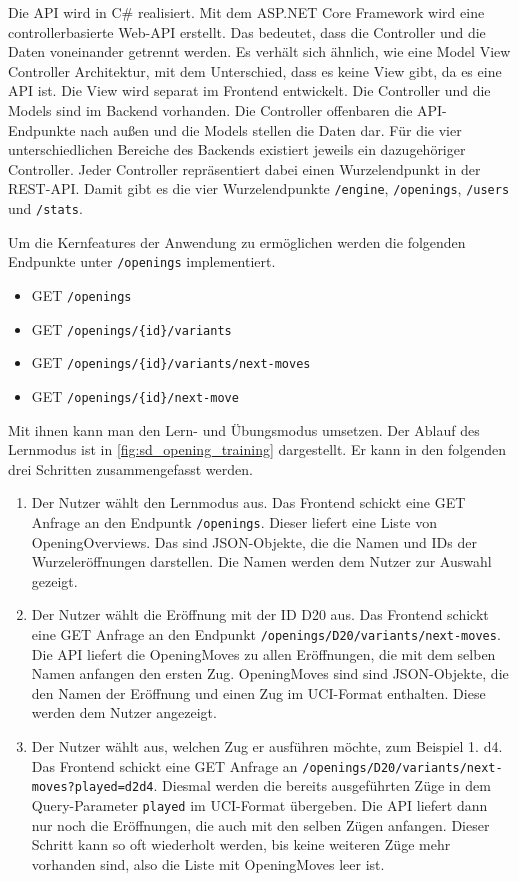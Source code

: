 Die API wird in C\# realisiert. Mit dem ASP.NET Core Framework wird eine controllerbasierte Web-API erstellt. Das bedeutet, dass die Controller und die Daten voneinander getrennt werden. Es verhält sich ähnlich, wie eine Model View Controller Architektur, mit dem Unterschied, dass es keine View gibt, da es eine API ist. Die View wird separat im Frontend entwickelt. Die Controller und die Models sind im Backend vorhanden. Die Controller offenbaren die API-Endpunkte nach außen und die Models stellen die Daten dar. Für die vier unterschiedlichen Bereiche des Backends existiert jeweils ein dazugehöriger Controller. Jeder Controller repräsentiert dabei einen Wurzelendpunkt in der REST-API. Damit gibt es die vier Wurzelendpunkte \lstinline{/engine}, \lstinline{/openings}, \lstinline{/users} und \lstinline{/stats}. 

Um die Kernfeatures der Anwendung zu ermöglichen werden die folgenden Endpunkte unter \lstinline{/openings} implementiert.

\begin{itemize}
    \item GET \verb|/openings|
    \item GET \verb|/openings/{id}/variants|
    \item GET \verb|/openings/{id}/variants/next-moves|
    \item GET \verb|/openings/{id}/next-move|
\end{itemize}

Mit ihnen kann man den Lern- und Übungsmodus umsetzen. Der Ablauf des Lernmodus ist in \autoref{fig:sd_opening_training} dargestellt. Er kann in den folgenden drei Schritten zusammengefasst werden.

\begin{enumerate}
     \item Der Nutzer wählt den Lernmodus aus. Das Frontend schickt eine GET Anfrage an den Endpuntk \lstinline{/openings}. Dieser liefert eine Liste von OpeningOverviews. Das sind JSON-Objekte, die die Namen und IDs der Wurzeleröffnungen darstellen. Die Namen werden dem Nutzer zur Auswahl gezeigt.
     \item Der Nutzer wählt die Eröffnung mit der ID D20 aus. Das Frontend schickt eine GET Anfrage an den Endpunkt \lstinline|/openings/D20/variants/next-moves|. Die API liefert die OpeningMoves zu allen Eröffnungen, die mit dem selben Namen anfangen den ersten Zug. OpeningMoves sind sind JSON-Objekte, die den Namen der Eröffnung und einen Zug im UCI-Format enthalten. Diese werden dem Nutzer angezeigt.
     \item Der Nutzer wählt aus, welchen Zug er ausführen möchte, zum Beispiel 1. d4. Das Frontend schickt eine GET Anfrage an \lstinline|/openings/D20/variants/next-moves?played=d2d4|. Diesmal werden die bereits ausgeführten Züge in dem Query-Parameter \lstinline{played} im UCI-Format übergeben. Die API liefert dann nur noch die Eröffnungen, die auch mit den selben Zügen anfangen. Dieser Schritt kann so oft wiederholt werden, bis keine weiteren Züge mehr vorhanden sind, also die Liste mit OpeningMoves leer ist.
\end{enumerate}

